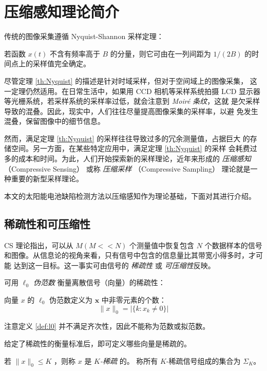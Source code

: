 \section{压缩感知理论简介}

传统的图像采集遵循 Nyquist-Shannon 采样定理：
\begin{theorem}[采样定理] \label{th:Nyquist}
若函数 $x(t)$ 不含有频率高于 $B$ 的分量，则它可由在一列间距为 $1/(2B)$
的时间点上的采样值完全确定。
\end{theorem}

尽管定理 \ref{th:Nyquist} 的描述是针对时域采样，但对于空间域上的图像采集，
这一定理仍然适用。在日常生活中，如果用 CCD 相机等采样系统拍摄 LCD 显示器
等光栅系统，若采样系统的采样率过低，就会注意到 \emph{Moir\'e 条纹}，这就
是欠采样导致的混叠。因此，现实中，人们往往尽量提高图像采集的采样率，以避
免发生混叠，保留图像中的细节信息。

然而，满足定理 \ref{th:Nyquist} 的采样往往导致过多的冗余测量值，占据巨大
的存储空间。另一方面，在某些特定应用中，满足定理 \ref{th:Nyquist} 的采样
会耗费过多的成本和时间。为此，人们开始探索新的采样理论，近年来形成的
\emph{压缩感知} （Compressive Sensing） 或称 \emph{压缩采样}
（Compressive Sampling） 理论就是一种重要的新型采样理论。

本文的太阳能电池缺陷检测方法以压缩感知作为理论基础，下面对其进行介绍。

\subsection{稀疏性和可压缩性}

CS 理论指出，可以从 $M (M << N)$ 个测量值中恢复包含 $N$ 个数据样本的信号
和图像。从信息论的视角来看，只有信号中包含的信息量比其带宽小得多时，才可能
达到这一目标。这一事实可由信号的 \emph{稀疏性} 或 \emph{可压缩性}反映。

可用 \emph{$\ell_0$ 伪范数} 衡量离散信号（向量）的稀疏性：

\begin{definition} \label{def:l0} 向量 $x$ 的
$\ell_0$ 伪范数定义为 $\mathbf{x}$ 中非零元素的个数：
$$\|x\|_0 = |\{k:x_k \neq 0\}|$$
\end{definition}
注意定义 \ref{def:l0} 并不满足齐次性，因此不能称为范数或拟范数。

给定了稀疏性的衡量标准后，即可定义哪些向量是稀疏的。
\begin{definition}[$K$-稀疏] \label{def:K-sparse} 若
$\|x\|_0 \leq K$ ，则称 $x$ 是 \emph{$K$-稀疏} 的。
称所有 $K$-稀疏信号组成的集合为 $\Sigma_K$。
\end{definition}

